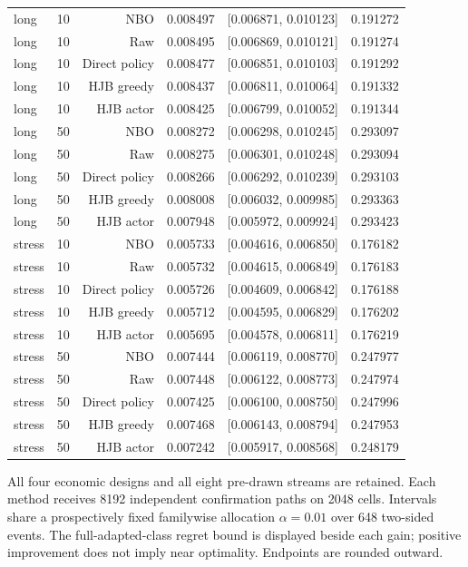 \begin{longtable}{lrrrrr}
long & 10 & NBO & 0.008497 & [0.006871, 0.010123] & 0.191272 \\
long & 10 & Raw & 0.008495 & [0.006869, 0.010121] & 0.191274 \\
long & 10 & Direct policy & 0.008477 & [0.006851, 0.010103] & 0.191292 \\
long & 10 & HJB greedy & 0.008437 & [0.006811, 0.010064] & 0.191332 \\
long & 10 & HJB actor & 0.008425 & [0.006799, 0.010052] & 0.191344 \\
long & 50 & NBO & 0.008272 & [0.006298, 0.010245] & 0.293097 \\
long & 50 & Raw & 0.008275 & [0.006301, 0.010248] & 0.293094 \\
long & 50 & Direct policy & 0.008266 & [0.006292, 0.010239] & 0.293103 \\
long & 50 & HJB greedy & 0.008008 & [0.006032, 0.009985] & 0.293363 \\
long & 50 & HJB actor & 0.007948 & [0.005972, 0.009924] & 0.293423 \\
stress & 10 & NBO & 0.005733 & [0.004616, 0.006850] & 0.176182 \\
stress & 10 & Raw & 0.005732 & [0.004615, 0.006849] & 0.176183 \\
stress & 10 & Direct policy & 0.005726 & [0.004609, 0.006842] & 0.176188 \\
stress & 10 & HJB greedy & 0.005712 & [0.004595, 0.006829] & 0.176202 \\
stress & 10 & HJB actor & 0.005695 & [0.004578, 0.006811] & 0.176219 \\
stress & 50 & NBO & 0.007444 & [0.006119, 0.008770] & 0.247977 \\
stress & 50 & Raw & 0.007448 & [0.006122, 0.008773] & 0.247974 \\
stress & 50 & Direct policy & 0.007425 & [0.006100, 0.008750] & 0.247996 \\
stress & 50 & HJB greedy & 0.007468 & [0.006143, 0.008794] & 0.247953 \\
stress & 50 & HJB actor & 0.007242 & [0.005917, 0.008568] & 0.248179 \\
\bottomrule
\end{longtable}
\par\medskip\noindent\footnotesize All four economic designs and all eight pre-drawn streams are retained. Each method receives 8192 independent confirmation paths on 2048 cells. Intervals share a prospectively fixed familywise allocation $\alpha=0.01$ over 648 two-sided events. The full-adapted-class regret bound is displayed beside each gain; positive improvement does not imply near optimality. Endpoints are rounded outward.
\endgroup
